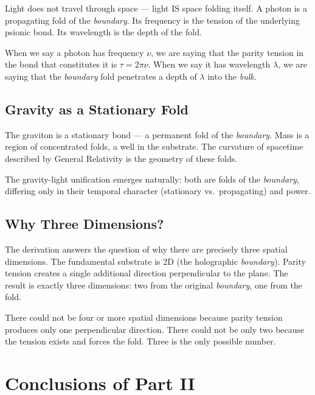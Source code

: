 \documentclass[12pt,a4paper,twoside]{article}
\newcommand{\boundary}{\textit{boundary}}
\newcommand{\bulk}{\textit{bulk}}
\begin{document}
Light does not travel through space --- light IS space folding itself. A photon is a propagating fold of the \boundary. Its frequency is the tension of the underlying psionic bond. Its wavelength is the depth of the fold.

When we say a photon has frequency $\nu$, we are saying that the parity tension in the bond that constitutes it is $\tau = 2\pi\nu$. When we say it has wavelength $\lambda$, we are saying that the \boundary{} fold penetrates a depth of $\lambda$ into the \bulk.

\subsection{Gravity as a Stationary Fold}

The graviton is a stationary bond --- a permanent fold of the \boundary. Mass is a region of concentrated folds, a well in the substrate. The curvature of spacetime described by General Relativity is the geometry of these folds.

The gravity-light unification emerges naturally: both are folds of the \boundary, differing only in their temporal character (stationary vs.\ propagating) and power.

\subsection{Why Three Dimensions?}

The derivation answers the question of why there are precisely three spatial dimensions. The fundamental substrate is 2D (the holographic \boundary). Parity tension creates a single additional direction perpendicular to the plane. The result is exactly three dimensions: two from the original \boundary, one from the fold.

There could not be four or more spatial dimensions because parity tension produces only one perpendicular direction. There could not be only two because the tension exists and forces the fold. Three is the only possible number.


\section{Conclusions of Part II}
\end{document}
